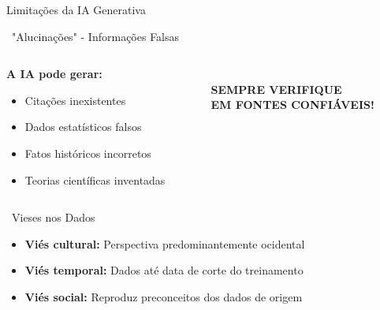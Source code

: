 \documentclass[aspectratio=169,12pt]{beamer}
\begin{document}
\begin{frame}{Limitações da IA Generativa}
    \begin{block}{\faBug\, "Alucinações" - Informações Falsas}
        \begin{columns}
            \begin{column}{0.6\textwidth}
                \textbf{A IA pode gerar:}
                \begin{itemize}
                    \item Citações inexistentes
                    \item Dados estatísticos falsos
                    \item Fatos históricos incorretos
                    \item Teorias científicas inventadas
                \end{itemize}
            \end{column}
            \begin{column}{0.4\textwidth}
                \textcolor{danger}{\faExclamationTriangle} \\
                \textbf{SEMPRE VERIFIQUE} \\
                \textbf{EM FONTES CONFIÁVEIS!}
            \end{column}
        \end{columns}
    \end{block}
    
    \begin{block}{\faExclamationCircle\, Vieses nos Dados}
        \begin{itemize}
            \item \textbf{Viés cultural:} Perspectiva predominantemente ocidental
            \item \textbf{Viés temporal:} Dados até data de corte do treinamento
            \item \textbf{Viés social:} Reproduz preconceitos dos dados de origem
        \end{itemize}
    \end{block}
\end{frame}
\end{document}
